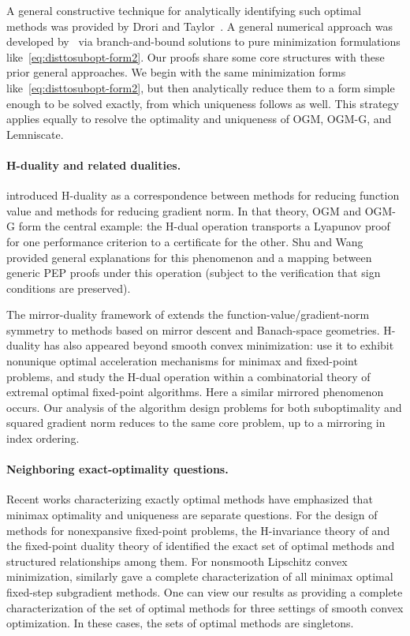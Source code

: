 \documentclass[11pt]{article}
\begin{document}
A general constructive technique for analytically identifying such optimal methods was provided by Drori and Taylor~\cite{DT20}. A general numerical approach was developed by~\cite{DGVR24} via branch-and-bound solutions to pure minimization formulations like~\eqref{eq:disttosubopt-form2}.
Our proofs share some core structures with these prior general approaches. We begin with the same minimization forms like~\eqref{eq:disttosubopt-form2}, but then analytically reduce them to a form simple enough to be solved exactly, from which uniqueness follows as well. This strategy applies equally to resolve the optimality and uniqueness of OGM, OGM-G, and Lemniscate.

\paragraph{H-duality and related dualities.}
\cite{KOPR23} introduced H-duality as a correspondence between methods
for reducing function value and methods for reducing gradient norm.
In that theory, OGM and OGM-G form the central example: the H-dual
operation transports a Lyapunov proof for one performance criterion to a
certificate for the other. Shu and Wang~\cite{Shu2026Hduality} provided general explanations for this phenomenon and a mapping between generic PEP proofs under this operation (subject to the verification that sign conditions are preserved).

The mirror-duality framework of
\cite{KPDOR24} extends the function-value/gradient-norm symmetry to
methods based on mirror descent and Banach-space geometries. H-duality has
also appeared beyond smooth convex minimization: \cite{YKSR24} use it
to exhibit nonunique optimal acceleration mechanisms for minimax and
fixed-point problems, and \cite{YG26} study the H-dual operation within
a combinatorial theory of extremal optimal fixed-point algorithms.
Here a similar mirrored phenomenon occurs. Our analysis of the algorithm design problems for both suboptimality and squared gradient norm reduces to the same core problem, up to a mirroring in index ordering.

\paragraph{Neighboring exact-optimality questions.}
Recent works characterizing exactly optimal methods have emphasized that minimax optimality and uniqueness are separate questions. For the design of methods for nonexpansive fixed-point problems, the H-invariance theory of
\cite{YRG25} and the fixed-point duality theory of \cite{YG26}
identified the exact set of optimal methods and structured relationships among them. For nonsmooth Lipschitz
convex minimization, \cite{ZG26} similarly gave a complete characterization of
all minimax optimal fixed-step subgradient methods. One can view our results as providing a complete characterization of the set of optimal methods for three settings of smooth convex optimization. In these cases, the sets of optimal methods are singletons.
\end{document}
